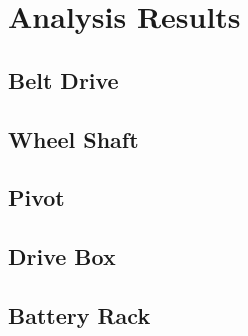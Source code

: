\section{Analysis Results}

\subsection{Belt Drive}\label{bd_fea}


\subsection{Wheel Shaft}\label{ws_fea}


\subsection{Pivot}\label{pivot_fea}


\subsection{Drive Box}\label{box_fea}

\subsection{Battery Rack}\label{br_fea}